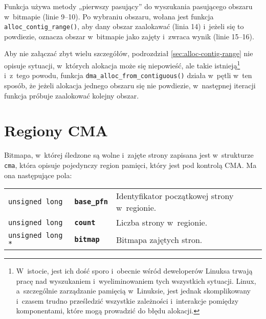 Funkcja używa metody „pierwszy pasujący” do wyszukania pasującego
obszaru w~bitmapie (linie 9--10).  Po wybraniu obszaru, wołana jest
funkcja \lstinline|alloc_contig_range()|, aby dany obszar zaalokawać
(linia 14) i~jeżeli się to powdiezie, oznacza obszar w~bitmapie jako
zajęty i~zwraca wynik (linie 15--16).

Aby nie załączać zbyt wielu szczegółów, podrozdział
\ref{sec:alloc-contig-range} nie opisuje sytuacji, w~których alokacja
może się niepowieść, ale takie istnieją\footnote{W~istocie, jest ich
  dość sporo i~obecnie wśród deweloperów Linuksa trwają pracę nad
  wyszukaniem i~wyeliminowaniem tych wszystkich sytuacji.  Linux,
  a~szczególnie zarządzanie pamięcią w~Linuksie, jest
  jednak skomplikowany i~czasem trudno prześledzić wszystkie
  zależności i~interakcje pomiędzy komponentami, które mogą prowadzić
  do błędu alokacji.} i~z~tego powodu, funkcja
\lstinline|dma_alloc_from_contiguous()| działa w~pętli w~ten sposób,
że jeżeli alokacja jednego obszaru się nie powdiezie, w~następnej
iteracji funkcja próbuje zaalokować kolejny obszar.

\section{Regiony CMA}

Bitmapa, w~której śledzone są wolne i~zajęte strony zapisana jest
w~strukturze \lstinline|cma|, która opisuje pojedynczy region pamięci,
który jest pod kontrolą CMA.  Ma ona następujące pola:

\begin{tabular}{lll}
\lstinline|unsigned long|   & {\bf \lstinline|base_pfn|} & Identyfikator początkowej strony w~regionie. \\
\lstinline|unsigned long|   & {\bf \lstinline|count|}    & Liczba strony w~regionie. \\
\lstinline|unsigned long *| & {\bf \lstinline|bitmap|}   & Bitmapa zajętych stron. \\
\end{tabular}
